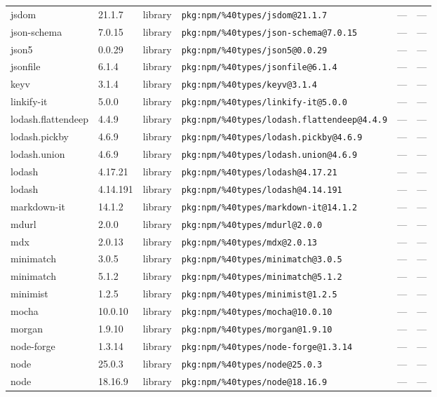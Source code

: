 \documentclass[11pt]{article}
\begin{document}
\begin{longtable}{|l|l|l|p{2.2cm}|l|p{4cm}|}
jsdom & 21.1.7 & library & \texttt{pkg:npm/\%40types/jsdom@21.1.7} & — & — \\
json-schema & 7.0.15 & library & \texttt{pkg:npm/\%40types/json-schema@7.0.15} & — & — \\
json5 & 0.0.29 & library & \texttt{pkg:npm/\%40types/json5@0.0.29} & — & — \\
jsonfile & 6.1.4 & library & \texttt{pkg:npm/\%40types/jsonfile@6.1.4} & — & — \\
keyv & 3.1.4 & library & \texttt{pkg:npm/\%40types/keyv@3.1.4} & — & — \\
linkify-it & 5.0.0 & library & \texttt{pkg:npm/\%40types/linkify-it@5.0.0} & — & — \\
lodash.flattendeep & 4.4.9 & library & \texttt{pkg:npm/\%40types/lodash.flattendeep@4.4.9} & — & — \\
lodash.pickby & 4.6.9 & library & \texttt{pkg:npm/\%40types/lodash.pickby@4.6.9} & — & — \\
lodash.union & 4.6.9 & library & \texttt{pkg:npm/\%40types/lodash.union@4.6.9} & — & — \\
lodash & 4.17.21 & library & \texttt{pkg:npm/\%40types/lodash@4.17.21} & — & — \\
lodash & 4.14.191 & library & \texttt{pkg:npm/\%40types/lodash@4.14.191} & — & — \\
markdown-it & 14.1.2 & library & \texttt{pkg:npm/\%40types/markdown-it@14.1.2} & — & — \\
mdurl & 2.0.0 & library & \texttt{pkg:npm/\%40types/mdurl@2.0.0} & — & — \\
mdx & 2.0.13 & library & \texttt{pkg:npm/\%40types/mdx@2.0.13} & — & — \\
minimatch & 3.0.5 & library & \texttt{pkg:npm/\%40types/minimatch@3.0.5} & — & — \\
minimatch & 5.1.2 & library & \texttt{pkg:npm/\%40types/minimatch@5.1.2} & — & — \\
minimist & 1.2.5 & library & \texttt{pkg:npm/\%40types/minimist@1.2.5} & — & — \\
mocha & 10.0.10 & library & \texttt{pkg:npm/\%40types/mocha@10.0.10} & — & — \\
morgan & 1.9.10 & library & \texttt{pkg:npm/\%40types/morgan@1.9.10} & — & — \\
node-forge & 1.3.14 & library & \texttt{pkg:npm/\%40types/node-forge@1.3.14} & — & — \\
node & 25.0.3 & library & \texttt{pkg:npm/\%40types/node@25.0.3} & — & — \\
node & 18.16.9 & library & \texttt{pkg:npm/\%40types/node@18.16.9} & — & — \\

\end{longtable}
\end{document}
